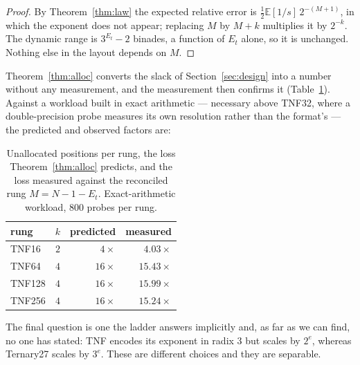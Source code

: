 \documentclass[11pt]{article}
\theoremstyle{definition}
\begin{document}
\begin{proof}
By Theorem~\ref{thm:law} the expected relative error is
$\tfrac12 \mathbb{E}[1/s]\,2^{-(M+1)}$, in which the exponent does not appear;
replacing $M$ by $M+k$ multiplies it by $2^{-k}$. The dynamic range is
$3^{E_t}-2$ binades, a function of $E_t$ alone, so it is unchanged. Nothing else in
the layout depends on $M$.
\end{proof}

Theorem~\ref{thm:alloc} converts the slack of Section~\ref{sec:design} into a
number without any measurement, and the measurement then confirms it
(Table~\ref{tab:alloc}). Against a
workload built in exact arithmetic --- necessary above TNF32, where a
double-precision probe measures its own resolution rather than the format's ---
the predicted and observed factors are:

\begin{table}[t]\centering
\caption{Unallocated positions per rung, the loss Theorem~\ref{thm:alloc}
predicts, and the loss measured against the reconciled rung
$M = N - 1 - E_t$. Exact-arithmetic workload, 800 probes per rung.}
\label{tab:alloc}
\begin{tabular}{lrrr}
\toprule
rung & $k$ & predicted & measured \\
\midrule
TNF16  & $2$ & $4\times$  & $4.03\times$  \\
TNF64  & $4$ & $16\times$ & $15.43\times$ \\
TNF128 & $4$ & $16\times$ & $15.99\times$ \\
TNF256 & $4$ & $16\times$ & $15.24\times$ \\
\bottomrule
\end{tabular}
\end{table}

The final question is one the ladder answers implicitly and, as far as we can
find, no one has stated: TNF encodes its exponent in radix 3 but scales by
$2^{e}$, whereas Ternary27 scales by $3^{e}$. These are different choices and
they are separable.
\end{document}
